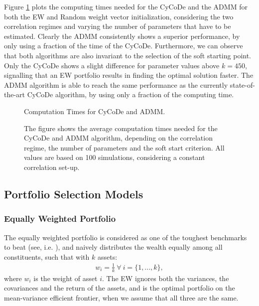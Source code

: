 \documentclass[12pt, a4paper]{article}
\begin{document}
%
Figure \ref{Comp_times} plots the computing times needed for the CyCoDe and the ADMM for both the EW and Random weight vector initialization, considering the two correlation regimes and varying the number of parameters that have to be estimated. Clearly the ADMM consistently shows a superior performance, by only using a fraction of the time of the CyCoDe. Furthermore, we can observe that both algorithms are also invariant to the selection of the soft starting point. Only the CyCoDe shows a slight difference for parameter values above $k=450$, signalling that an EW portfolio results in finding the optimal solution faster. The ADMM algorithm is able to reach the same performance as the currently state-of-the-art CyCoDe algorithm, by using only a fraction of the computing time.
%
\begin{figure}
\centering
\caption{Computation Times for CyCoDe and ADMM.}\label{Comp_times}
\captionsetup{font=scriptsize,labelfont=scriptsize, width=\textwidth}
\caption*{The figure shows the average computation times needed for the CyCoDe and ADMM algorithm, depending on the correlation regime, the number of parameters and the soft start criterion. All values are based on 100 simulations, considering a constant correlation set-up.}
\end{figure}
%

\subsection{Portfolio Selection Models}
\subsubsection*{Equally Weighted Portfolio}
%
The equally weighted portfolio is considered as one of the toughest benchmarks to beat (see, i.e. \cite{DeMiguel2009}), and naively distributes the wealth equally among all constituents, such that with $k$ assets:
\begin{gather}
w_i = \frac{1}{k} \ \forall	\ i=\{1,...,k\},
\end{gather}
where $w_i$ is the weight of asset $i$. The EW ignores both the variances, the covariances and the return of the assets, and is the optimal portfolio on the mean-variance efficient frontier, when we assume that all three are the same.
%
\end{document}
